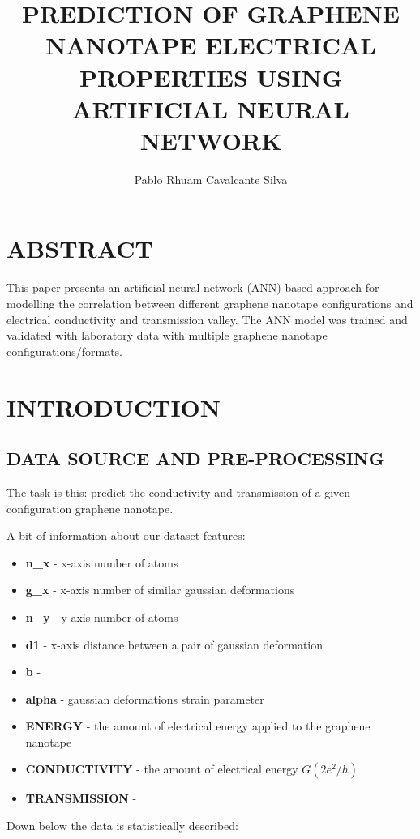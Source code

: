 \documentclass{report}
\title{PREDICTION OF GRAPHENE NANOTAPE ELECTRICAL PROPERTIES USING ARTIFICIAL NEURAL NETWORK}
\author{Pablo Rhuam Cavalcante Silva}
\begin{document}
\maketitle

\section{ABSTRACT}
This paper presents an artificial neural network (ANN)-based approach for modelling the correlation between different graphene nanotape configurations and electrical conductivity and transmission valley. The ANN model was trained and validated with laboratory data with multiple graphene nanotape configurations/formats.



\section{INTRODUCTION}
\subsection{DATA SOURCE AND PRE-PROCESSING}

The task is this: predict the conductivity and transmission of a given configuration graphene nanotape.

A bit of information about our dataset features:

\begin{itemize}
    \item \textbf{n\_x} - x-axis number of atoms
    \item \textbf{g\_x} - x-axis number of similar gaussian deformations
    \item \textbf{n\_y} - y-axis number of atoms
    \item \textbf{d1} - x-axis distance between a pair of gaussian deformation
    \item \textbf{b} - 
    \item \textbf{alpha} - gaussian deformations strain parameter 
    \item \textbf{ENERGY} - the amount of electrical energy applied to the graphene nanotape
    \item \textbf{CONDUCTIVITY} - the amount of electrical energy $G(2e^2/h)$
    \item \textbf{TRANSMISSION} - 
\end{itemize}

Down below the data is statistically described:
\end{document}
